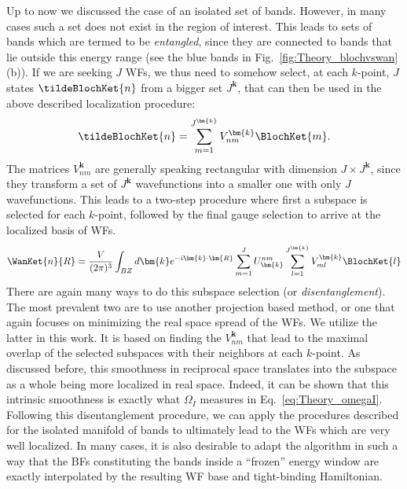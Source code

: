 Up to now we discussed the case of an isolated set of bands.
However, in many cases such a set does not exist in the region of interest.
This leads to sets of bands which are termed to be {\it entangled}, since they are connected to bands that lie outside this energy range (see the blue bands in Fig.~\ref{fig:Theory_blochvswan}(b)).
If we are seeking $J$ WFs, we thus need to somehow select, at each $k$-point, $J$ states $\tildeBlochKet{n}$ from a bigger set $J^{\bm{k}}$, that can then be used in the above described localization procedure:
\begin{equation}
	\tildeBlochKet{n} = \sum_{m=1}^{J^{\bm{k}}}V_{nm}^{\bm{k}} \BlochKet{m}.
\end{equation}
The matrices $V_{nm}^{\bm{k}}$ are generally speaking rectangular with dimension $J\times J^{\bm{k}}$, since they transform a set of $J^{\bm{k}}$ wavefunctions into a smaller one with only $J$ wavefunctions.
This leads to a two-step procedure where first a subspace is selected for each $k$-point, followed by the final gauge selection to arrive at the localized basis of WFs.
\begin{equation}
	\WanKet{n}{R} = \frac{V}{(2\pi)^3} \int_{BZ} d\bm{k} e^{-i \bm{k} \cdot \bm{R}} \sum_{m=1}^J U^{nm}_{\bm{k}} \sum_{l=1}^{J^{\bm{k}}} V_{ml}^{\bm{k}} \BlochKet{l}
\end{equation}
There are again many ways to do this subspace selection (or {\it disentanglement}).
The most prevalent two are to use another projection based method, or one that again focuses on minimizing the real space spread of the WFs.
We utilize the latter in this work.
It is based on finding the $V_{nm}^{\bm{k}}$ that lead to the maximal overlap of the selected subspaces with their neighbors at each $k$-point.
As discussed before, this smoothness in reciprocal space translates into the subspace as a whole being more localized in real space.
Indeed, it can be shown \cite{Marzari2012} that this intrinsic smoothness is exactly what $\Omega_I$ measures in Eq.~\ref{eq:Theory_omegaI}. 
Following this disentanglement procedure, we can apply the procedures described for the isolated manifold of bands to ultimately lead to the WFs which are very well localized.
In many cases, it is also desirable to adapt the algorithm in such a way that the BFs constituting the bands inside a ``frozen'' energy window are exactly interpolated by the resulting WF base and tight-binding Hamiltonian.

